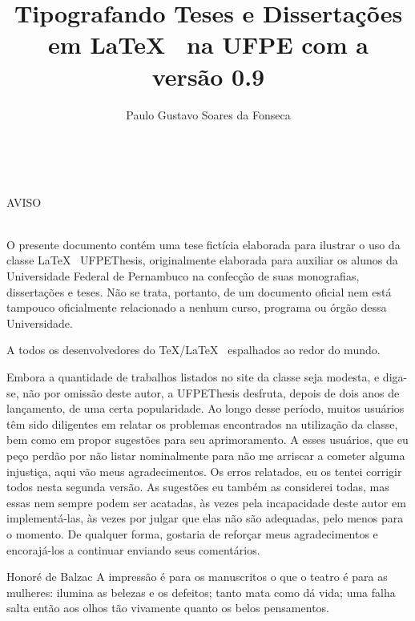 \documentclass[phd,oneside,scr]{ufpethesis}
\institute{Centro de Ciências Hipotéticas Gerais}
\title{Tipografando Teses e Dissertações em \LaTeX~
na UFPE com a \ufpethesis\\ versão 0.9}
\author{Paulo Gustavo Soares da Fonseca}
\newcommand{\ufpethesis}{\textsf{UFPEThesis}\xspace}
\begin{document}

\thispagestyle{empty}
~\\\vskip 5cm
\centerline{\Large\sf AVISO}
~\\

\noindent O presente documento contém uma tese fictícia elaborada para ilustrar o
uso da classe \LaTeX~ \ufpethesis, originalmente elaborada para auxiliar os
alunos da Universidade Federal de Pernambuco na confecção de suas monografias,
dissertações e teses. Não se trata, portanto, de um documento oficial nem 
está tampouco oficialmente relacionado a nenhum curso, programa ou órgão dessa 
Universidade.

\frontmatter

\frontpage
\presentationpage
\begin{dedicatory}
A todos os desenvolvedores do \TeX/\LaTeX~ espalhados ao redor do mundo.
\end{dedicatory}

\acknowledgements

%
%
%
%
%
Embora a quantidade de trabalhos listados no site da classe seja modesta, e diga-se, não por omissão deste autor, a \ufpethesis desfruta, depois de dois anos de lançamento, de uma certa popularidade. Ao longo desse período, muitos usuários têm sido diligentes em relatar os problemas encontrados na utilização da classe, bem como em propor sugestões para seu aprimoramento. A esses usuários, que eu peço perdão por não listar nominalmente para não me arriscar a cometer alguma injustiça, aqui vão meus agradecimentos. Os erros relatados, eu os tentei corrigir todos nesta segunda versão. As sugestões eu também as considerei todas, mas essas nem sempre podem ser acatadas, às vezes pela incapacidade deste autor em implementá-las, às vezes por julgar que elas não são adequadas, pelo menos para o momento. De qualquer forma, gostaria de reforçar meus agradecimentos e encorajá-los a continuar enviando seus comentários.


\begin{epigraph}{Honoré de Balzac}
A impressão é para os manuscritos o que o teatro é para as mulheres:
ilumina as belezas e os defeitos; tanto mata como dá vida;
uma falha salta então aos olhos tão vivamente quanto os belos pensamentos.
\end{epigraph}
\end{document}
